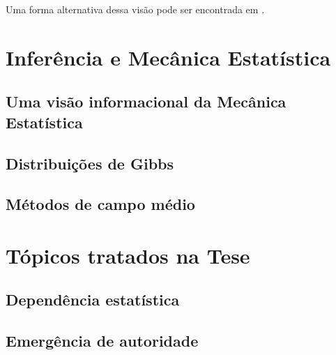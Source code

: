 Uma forma alternativa dessa visão pode ser encontrada\cite[-1cm]{NCaticha2011} em \citet{NCaticha2011}.

\section{Inferência e Mecânica Estatística}
\subsection{Uma visão informacional da Mecânica Estatística}
\subsection{Distribuições de Gibbs}
\subsection{Métodos de campo médio}

\section{Tópicos tratados na Tese}
\subsection{Dependência estatística}
\subsection{Emergência de autoridade}
